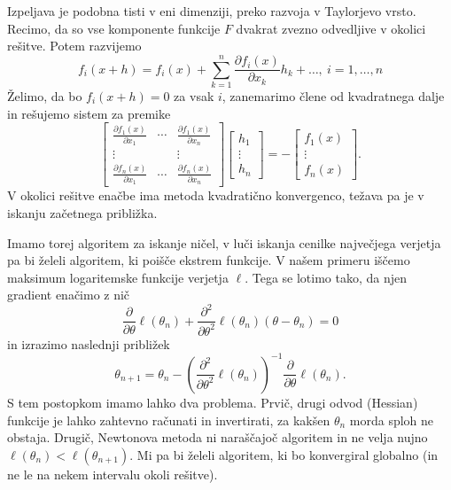 \documentclass[12pt,a4paper]{amsart}
\theoremstyle{definition} %
\theoremstyle{plain} %
\begin{document}
Izpeljava je podobna tisti v eni dimenziji, preko razvoja v Taylorjevo vrsto. Recimo, da so vse komponente funkcije $F$ dvakrat zvezno odvedljive v okolici rešitve. Potem razvijemo
\[
    f_{i}(x+h) = f_{i}(x) + \sum_{k=1}^{n} \frac{\partial f_{i}(x)}{\partial x_{k}}h_{k} + \ldots,~i=1,\ldots,n
\]
Želimo, da bo $f_{i}(x+h) = 0$ za vsak $i$, zanemarimo člene od kvadratnega dalje in rešujemo sistem za premike
\[
    \begin{bmatrix}
        \frac{\partial f_{1}(x)}{\partial x_{1}} & \cdots & \frac{\partial f_{1}(x)}{\partial x_{n}} \\
        \vdots & & \vdots \\
        \frac{\partial f_{n}(x)}{\partial x_{1}} & \cdots & \frac{\partial f_{n}(x)}{\partial x_{n}}
    \end{bmatrix}
    \begin{bmatrix}
        h_{1} \\
        \vdots\\
        h_{n}
    \end{bmatrix} 
    = -
    \begin{bmatrix}
       f_{1}(x) \\
       \vdots \\
       f_{n}(x)
    \end{bmatrix}.
\]
V okolici rešitve enačbe ima metoda kvadratično konvergenco, težava pa je v iskanju začetnega približka.

Imamo torej algoritem za iskanje ničel, v luči iskanja cenilke največjega verjetja pa bi želeli algoritem, ki poišče ekstrem funkcije.
V našem primeru iščemo maksimum logaritemske funkcije verjetja $\ell.$ Tega se lotimo tako, da njen gradient enačimo z nič
\[
    \frac{\partial}{\partial\theta} \ell(\theta_{n}) + \frac{\partial^2}{\partial\theta^2}\ell(\theta_{n})(\theta - \theta_{n}) = 0
\]
in izrazimo naslednji približek
\[
    \theta_{n + 1} = \theta_{n} - \left(\frac{\partial^2}{\partial\theta^2}\ell(\theta_{n})\right)^{-1}\frac{\partial}{\partial\theta}\ell(\theta_{n}).
\]
S tem postopkom imamo lahko dva problema. Prvič, drugi odvod (Hessian) funkcije je lahko zahtevno računati in invertirati, za kakšen $\theta_{n}$ morda sploh ne obstaja.
Drugič, Newtonova metoda ni naraščajoč algoritem in ne velja nujno $\ell(\theta_{n}) < \ell(\theta_{n+1}).$ Mi pa bi želeli algoritem, ki bo konvergiral globalno (in ne le na nekem intervalu okoli rešitve).
\end{document}
